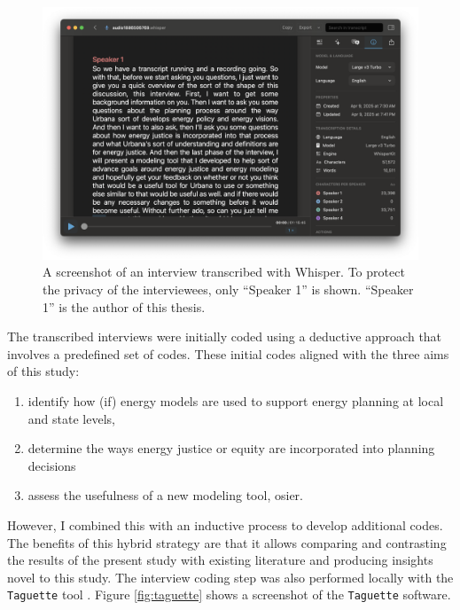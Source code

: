 \begin{figure}[htbp!]
    \centering
    \includegraphics[width=0.8\columnwidth]{figures/07_interview_chapter/whisper-screenshot.png}
    \caption{A screenshot of an interview transcribed with Whisper. To protect
    the privacy of the interviewees, only ``Speaker 1'' is shown. ``Speaker 1''
    is the author of this thesis.}
    \label{fig:whisper}
\end{figure}

The transcribed interviews were initially coded using a deductive approach that involves a
predefined set of codes. These initial codes aligned with the three aims of this study:
\begin{enumerate}
    \item identify how (if) energy models are used to support energy planning at
    local and state levels,
    \item determine the ways energy justice or equity are incorporated into
    planning decisions
    \item assess the usefulness of a new modeling tool, \ac{osier}.
\end{enumerate} 
However, I combined this with an inductive process to develop additional codes.
The benefits of this hybrid strategy are that it allows comparing and
contrasting the results of the present study with existing literature and
producing insights novel to this study. The interview coding step was also
performed locally with the \texttt{Taguette} tool \cite{rampin_taguette_2021}.
Figure \ref{fig:taguette} shows a screenshot of the \texttt{Taguette} software.

